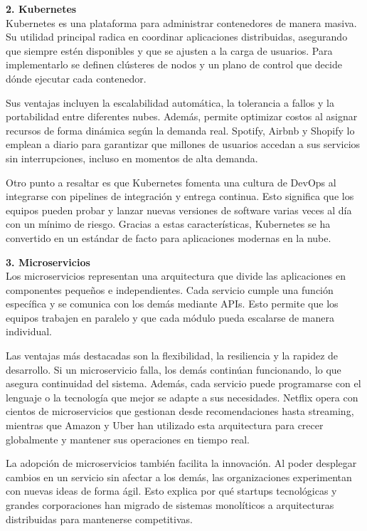 \documentclass[12pt,letterpaper]{article}
\begin{document}
\textbf{2. Kubernetes}\\
Kubernetes es una plataforma para administrar contenedores de manera masiva. Su utilidad principal radica en coordinar aplicaciones distribuidas, asegurando que siempre estén disponibles y que se ajusten a la carga de usuarios. Para implementarlo se definen clústeres de nodos y un plano de control que decide dónde ejecutar cada contenedor.  

Sus ventajas incluyen la escalabilidad automática, la tolerancia a fallos y la portabilidad entre diferentes nubes. Además, permite optimizar costos al asignar recursos de forma dinámica según la demanda real. Spotify, Airbnb y Shopify lo emplean a diario para garantizar que millones de usuarios accedan a sus servicios sin interrupciones, incluso en momentos de alta demanda.  

Otro punto a resaltar es que Kubernetes fomenta una cultura de DevOps al integrarse con pipelines de integración y entrega continua. Esto significa que los equipos pueden probar y lanzar nuevas versiones de software varias veces al día con un mínimo de riesgo. Gracias a estas características, Kubernetes se ha convertido en un estándar de facto para aplicaciones modernas en la nube.

\textbf{3. Microservicios}\\
Los microservicios representan una arquitectura que divide las aplicaciones en componentes pequeños e independientes. Cada servicio cumple una función específica y se comunica con los demás mediante APIs. Esto permite que los equipos trabajen en paralelo y que cada módulo pueda escalarse de manera individual.  

Las ventajas más destacadas son la flexibilidad, la resiliencia y la rapidez de desarrollo. Si un microservicio falla, los demás continúan funcionando, lo que asegura continuidad del sistema. Además, cada servicio puede programarse con el lenguaje o la tecnología que mejor se adapte a sus necesidades. Netflix opera con cientos de microservicios que gestionan desde recomendaciones hasta streaming, mientras que Amazon y Uber han utilizado esta arquitectura para crecer globalmente y mantener sus operaciones en tiempo real.  

La adopción de microservicios también facilita la innovación. Al poder desplegar cambios en un servicio sin afectar a los demás, las organizaciones experimentan con nuevas ideas de forma ágil. Esto explica por qué startups tecnológicas y grandes corporaciones han migrado de sistemas monolíticos a arquitecturas distribuidas para mantenerse competitivas.
\end{document}
